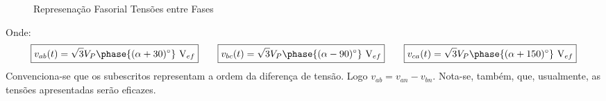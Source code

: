 \documentclass{article}
\begin{document}
\begin{definition}
\begin{figure}[H]
                    \caption{Represenação Fasorial Tensões entre Fases}
                \end{figure}\noindent
            Onde:
                \begin{equation}
                    \boxed{v_{ab}(t) = \sqrt{3}V_{P}\phase{(\alpha + 30)^{\circ}}\text{ V}_{ef}}
                    \qquad
                    \boxed{v_{bc}(t) = \sqrt{3}V_{P}\phase{(\alpha - 90)^{\circ}}\text{ V}_{ef}}
                    \qquad
                    \boxed{v_{ca}(t) = \sqrt{3}V_{P}\phase{(\alpha +150)^{\circ}}\text{ V}_{ef}}
                \end{equation}
            Convenciona-se que os subescritos representam a ordem da diferença de tensão. Logo $v_{ab} = v_{an} - v_{bn}$. Nota-se, também, que, usualmente, as tensões apresentadas serão eficazes.
        \end{definition}
\end{document}
